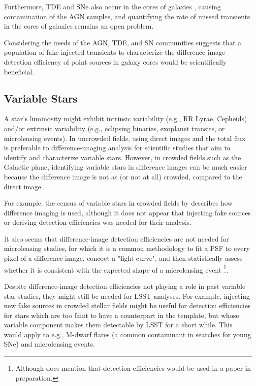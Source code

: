 Furthermore, TDE and SNe also occur in the cores of galaxies \citep[e.g.,][]{2009A&A...507L..17P,2012ApJ...744L..19K}, causing contamination of the AGN samples, and quantifying the rate of missed transients in the cores of galaxies remains an open problem.

Considering the needs of the AGN, TDE, and SN communities suggests that a population of fake injected transients to characterize the difference-image detection efficiency of point sources in galaxy cores would be scientifically beneficial.



\subsection{Variable Stars}\label{ssec:sci_varstar}

A star's luminosity might exhibit intrinsic variability (e.g., RR Lyrae, Cepheids) and/or extrinsic variability (e.g., eclipsing binaries, exoplanet transits, or microlensing events).
In uncrowded fields, using direct images and the total flux is preferable to difference-imaging analysis for scientific studies that aim to identify and characterize variable stars.
However, in crowded fields such as the Galactic plane, identifying variable stars in difference images can be much easier because the difference image is not as (or not at all) crowded, compared to the direct image.

For example, the census of variable stars in crowded fields by \cite{2016A&A...588A.128F} describes how difference imaging is used, although it does not appear that injecting fake sources or deriving detection efficiencies was needed for their analysis.

It also seems that difference-image detection efficiencies are not needed for microlensing studies, for which it is a common methodology to fit a PSF to every pixel of a difference image, concoct a "light curve", and then statistically assess whether it is consistent with the expected shape of a microlensing event \cite{2015ApJ...806..161L}\footnote{Although \cite{2015ApJ...806..161L} does mention that detection efficiencies would be used in a paper in preparation.}. 

Despite difference-image detection efficiencies not playing a role in past variable star studies, they might still be needed for LSST analyses.
For example, injecting new fake sources in crowded stellar fields might be useful for detection efficiencies for stars which are too faint to have a counterpart in the template, but whose variable component makes them detectable by LSST for a short while.
This would apply to e.g., M-dwarf flares (a common contaminant in searches for young SNe) and microlensing events.

